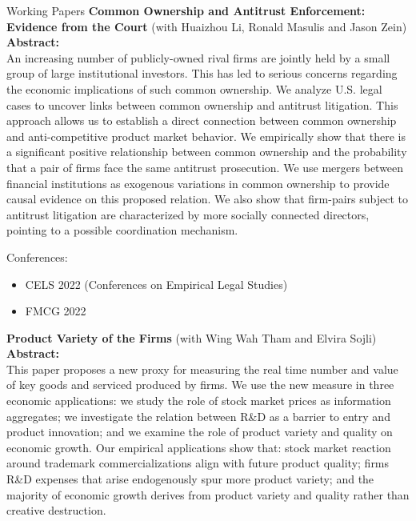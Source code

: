 \documentclass{resume} %
\begin{document}
\begin{rSection}{Working Papers}
	{\bf Common Ownership and Antitrust Enforcement: Evidence from the Court} (with Huaizhou Li, Ronald Masulis and Jason Zein)\\
	{\bf Abstract:}\\
	An increasing number of publicly-owned rival firms are jointly held by a small group of large institutional investors. This has led to serious concerns regarding the economic implications of such common ownership. We analyze U.S. legal cases to uncover links between common ownership and antitrust litigation. This approach allows us to establish a direct connection between common ownership and anti-competitive product market behavior. We empirically show that there is a significant positive relationship between common ownership and the probability that a pair of firms face the same antitrust prosecution. We use mergers between financial institutions as exogenous variations in common ownership to provide causal evidence on this proposed relation. We also show that firm-pairs subject to antitrust litigation are characterized by more socially connected directors, pointing to a possible coordination mechanism.

	Conferences:

	\begin{itemize}
		\item CELS 2022 (Conferences on Empirical Legal Studies)
		\item FMCG 2022
	\end{itemize}


	{\bf Product Variety of the Firms} (with Wing Wah Tham and Elvira Sojli)\\
	{\bf Abstract:}\\
	This paper proposes a new proxy for measuring the real time number and value of key goods and serviced produced by firms. We use the new measure in three economic applications: we study the role of stock market prices as information aggregates; we investigate the relation between R\&D as a barrier to entry and product innovation; and we examine the role of product variety and quality on economic growth. Our empirical applications show that: stock market reaction around trademark commercializations align with future product quality; firms R\&D expenses that arise endogenously spur more product variety; and the majority of economic growth derives from product variety and quality rather than creative destruction.


\end{rSection}
\end{document}
